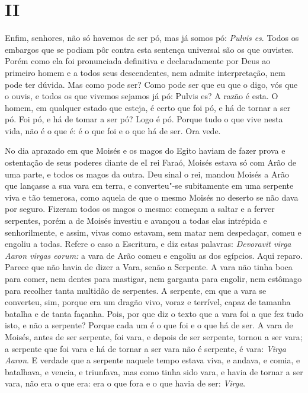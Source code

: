 \section*{II}

Enfim, senhores, não só havemos de ser pó, mas já somos pó: \emph{Pulvis
es}. Todos os embargos que se podiam pôr contra esta sentença universal
são os que ouvistes. Porém como ela foi pronunciada definitiva e
declaradamente por Deus ao primeiro homem e a todos seus descendentes,
nem admite interpretação, nem pode ter dúvida. Mas como pode ser? Como
pode ser que eu que o digo, vós que o ouvis, e todos os que vivemos
sejamos já pó: Pulvis es?
A razão é esta. O homem, em qualquer estado que esteja, é certo que foi
pó, e há de tornar a ser pó. Foi pó, e há de tomar a ser pó? Logo é pó.
Porque tudo o que vive nesta vida, não é o que é: é o que foi e o que há
de ser. Ora vede.

No dia aprazado em que Moisés e os magos do Egito haviam de fazer prova
e ostentação de seus poderes diante de eI rei Faraó, Moisés estava só
com Arão de uma parte, e todos os magos da outra. Deu sinal o rei,
mandou Moisés a Arão que lançasse a sua vara em terra, e converteu"-se
subitamente em uma serpente viva e tão temerosa, como aquela de que o
mesmo Moisés no deserto se não dava por seguro. Fizeram todos os magos o
mesmo: começam a saltar e a ferver serpentes, porém a de Moisés investiu
e avançou a todas elas intrépida e senhorilmente, e assim, vivas como
estavam, sem matar nem despedaçar, comeu e engoliu a todas. Refere o
caso a Escritura, e diz estas palavras: \emph{Devoravit virga Aaron
virgas eorum:} a vara de Arão comeu e engoliu as dos egípcios. Aqui reparo.
Parece que não havia de dizer a Vara, senão a Serpente. A vara
não tinha boca para comer, nem dentes para mastigar, nem garganta para
engolir, nem estômago para recolher tanta multidão de serpentes. A
serpente, em que a vara se converteu, sim, porque era um dragão vivo,
voraz e terrível, capaz de tamanha batalha e de tanta façanha. Pois, por
que diz o texto que a vara foi a que fez tudo isto, e não a serpente?
Porque cada um é o que foi e o que há de ser. A vara de Moisés, antes de
ser serpente, foi vara, e depois de ser serpente, tornou a ser vara; a
serpente que foi vara e há de tornar a ser vara não é serpente, é vara:
\emph{Virga Aaron}. E verdade que a serpente naquele tempo estava viva,
e andava, e comia, e batalhava, e vencia, e triunfava, mas como tinha
sido vara, e havia de tornar a ser vara, não era o que era: era o que
fora e o que havia de ser: \emph{Virga}.

